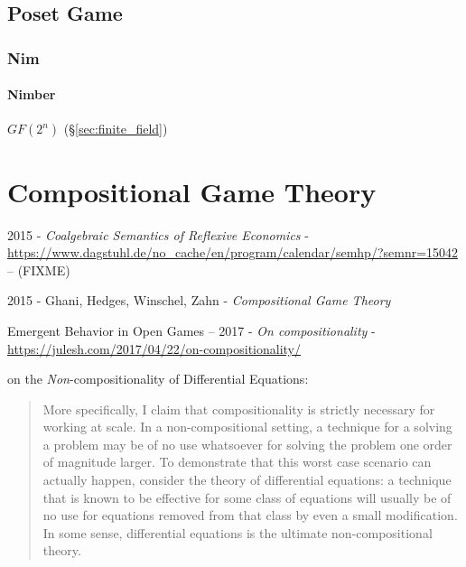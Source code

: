 \subsection{Poset Game}\label{sec:poset_game}

\subsubsection{Nim}\label{sec:nim}

\paragraph{Nimber}\label{sec:nimber}\hfill

$GF(2^n)$ (\S\ref{sec:finite_field})



\section{Compositional Game Theory}\label{sec:compositional_game_theory}

2015 - \emph{Coalgebraic Semantics of Reflexive Economics} -
\url{https://www.dagstuhl.de/no_cache/en/program/calendar/semhp/?semnr=15042} --
(FIXME)

2015 - Ghani, Hedges, Winschel, Zahn - \emph{Compositional Game Theory}

Emergent Behavior in Open Games --
2017 - \emph{On compositionality} -
\url{https://julesh.com/2017/04/22/on-compositionality/}

on the \emph{Non}-compositionality of Differential Equations:
\begin{quote}
  More specifically, I claim that compositionality is strictly necessary
  for working at scale. In a non-compositional setting, a technique for a
  solving a problem may be of no use whatsoever for solving the problem one
  order of magnitude larger. To demonstrate that this worst case scenario can
  actually happen, consider the theory of differential equations: a technique
  that is known to be effective for some class of equations will usually be of
  no use for equations removed from that class by even a small modification. In
  some sense, differential equations is the ultimate non-compositional theory.
\end{quote}


